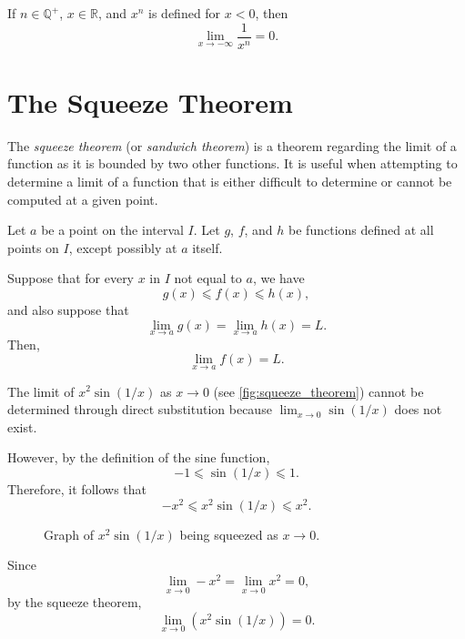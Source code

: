 \documentclass[headings=standardclasses]{scrreprt}
\begin{document}
\begin{nfact}
  If \(n ∈ ℚ^{+}\), \(x ∈ ℝ\), and \(x^{n}\) is defined for \(x < 0\), then
  \[ \lim_{x → -∞} \frac{1}{x^{n}} = 0. \]
\end{nfact}

\section{The Squeeze Theorem}

The \emph{squeeze theorem} (or \emph{sandwich theorem}) is a theorem regarding
the limit of a function as it is bounded by two other functions. It is useful
when attempting to determine a limit of a function that is either difficult to
determine or cannot be computed at a given point.

\begin{theorem}
  Let \(a\) be a point on the interval \(I\). Let \(g\), \(f\), and \(h\) be
  functions defined at all points on \(I\), except possibly at \(a\) itself.

  Suppose that for every \(x\) in \(I\) not equal to \(a\), we have
  \[ g(x) ⩽ f(x) ⩽ h(x), \] and also suppose that
  \[ \lim_{x → a } g(x) = \lim_{x → a} h(x) = L. \] Then,
  \[ \lim_{x → a} f(x) = L. \]
\end{theorem}

\begin{example}
  The limit of \(x^{2} \sin(1/x)\) as \(x → 0\) (see
  \autoref{fig:squeeze_theorem}) cannot be determined through direct
  substitution because \(\lim_{x → 0} \sin(1/x)\) does not exist.

  However, by the definition of the sine function,
  \[ -1 ⩽ \sin(1/x) ⩽ 1. \] Therefore, it follows that
  \[ -x^{2} ⩽ x^{2} \sin(1/x) ⩽ x^{2}. \]

  \begin{figure}[h]
    \centering


    \caption{Graph of \(x^{2} \sin(1/x)\) being squeezed as \(x →
      0\).}\label{fig:squeeze_theorem}
  \end{figure}

  Since
  \[ \lim_{x → 0} -x^{2} = \lim_{x → 0} x^{2} = 0, \] by the squeeze theorem,
  \[ \lim_{x → 0} (x^{2} \sin(1/x)) = 0. \]
\end{example}
\end{document}
